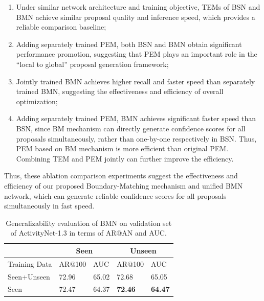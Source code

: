 \documentclass[10pt,twocolumn,letterpaper]{article}
\begin{document}
\begin{enumerate}
\setlength{\itemsep}{0pt}
\setlength{\parsep}{0pt}
\setlength{\parskip}{0pt}
\item Under similar network architecture and training objective, TEMs of BSN and BMN achieve similar proposal quality  and inference speed, which provides a reliable comparison baseline;
%
\item Adding separately trained PEM, both BSN and BMN obtain significant performance promotion,  suggesting that PEM plays an important role in the ``local to global'' proposal generation framework;
%
\item Jointly trained BMN achieves higher recall and faster speed than separately trained BMN, suggesting the effectiveness and efficiency of overall optimization;
%
\item Adding separately trained PEM, BMN achieves significant faster speed than BSN, since BM mechanism can directly generate confidence scores for all proposals simultaneously, rather than one-by-one respectively in BSN. Thus, PEM based on BM mechanism is  more efficient than original PEM. Combining TEM and PEM jointly can further improve the efficiency.
%
\end{enumerate}


Thus, these ablation comparison experiments suggest the effectiveness and efficiency of our proposed Boundary-Matching mechanism and unified BMN network, which can generate reliable confidence scores for all proposals simultaneously in fast speed.



\begin{table}[tbp]
\setlength{\belowcaptionskip}{-0.5cm} %
\centering
\caption{  Generalizability evaluation of BMN on validation set of ActivityNet-1.3 in terms of AR@AN and AUC.  }
\small
\begin{tabular}{m{2.0cm}m{1.0cm}<{\centering}m{1.0cm}<{\centering}m{1.0cm}<{\centering}m{1.0cm}<{\centering}}
\toprule
 & \multicolumn{2}{c}{Seen } & \multicolumn{2}{c}{Unseen }  \\
\hline 
Training Data &  AR@100  & AUC & AR@100 & AUC \\
\hline 
Seen+Unseen 	& 72.96 & 65.02 & 72.68 & 65.05 \\
Seen  		    & 72.47 & 64.37 & {\bf 72.46} & {\bf 64.47} \\
\bottomrule
\end{tabular}
\label{table:gene}
\end{table}
\end{document}
